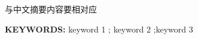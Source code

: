 \cleardoublepage{}

\begin{englishabstract}

与中文摘要内容要相对应
	

{
    \vspace{2cm}
    \noindent
    \textbf{KEYWORDS:}  keyword 1 ; keyword 2 ;keyword 3\par  %
}





\end{englishabstract}